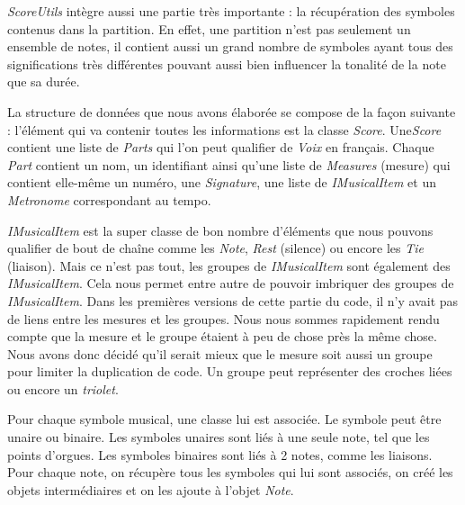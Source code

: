 \par
\emph{ScoreUtils} intègre aussi une partie très importante : la récupération des symboles contenus dans la partition. En effet, une partition n'est pas seulement un ensemble de notes, il contient aussi un grand nombre de symboles ayant tous des significations très différentes pouvant aussi bien influencer la tonalité de la note que sa durée.


\par
La structure de données que nous avons élaborée se compose de la façon suivante : l'élément qui va contenir toutes les informations est la classe \emph{Score}. Une\emph{Score} contient une liste de \emph{Parts} qui l'on peut qualifier de \emph{Voix} en français. Chaque \emph{Part} contient un nom, un identifiant ainsi qu'une liste de \emph{Measures} (mesure) qui contient elle-même un numéro, une \emph{Signature}, une liste de \emph{IMusicalItem} et un \emph{Metronome} correspondant au tempo.

\par
\emph{IMusicalItem} est la super classe de bon nombre d'éléments que nous pouvons qualifier de bout de chaîne comme les \emph{Note}, \emph{Rest} (silence) ou encore les \emph{Tie} (liaison). Mais ce n'est pas tout, les groupes de \emph{IMusicalItem} sont également des \emph{IMusicalItem}. Cela nous permet entre autre de pouvoir imbriquer des groupes de \emph{IMusicalItem}. Dans les premières versions de cette partie du code, il n'y avait pas de liens entre les mesures et les groupes. Nous nous sommes rapidement rendu compte que la mesure et le groupe étaient à peu de chose près la même chose. Nous avons donc décidé qu'il serait mieux que le mesure soit aussi un groupe pour limiter la duplication de code. Un groupe peut représenter des croches liées ou encore un \emph{triolet}.

\par
Pour chaque symbole musical, une classe lui est associée. Le symbole peut être unaire ou binaire. Les symboles unaires sont liés à une seule note, tel que les points d'orgues. Les symboles binaires sont liés à 2 notes, comme les liaisons. Pour chaque note, on récupère tous les symboles qui lui sont associés, on créé les objets intermédiaires et on les ajoute à l'objet \emph{Note}.

